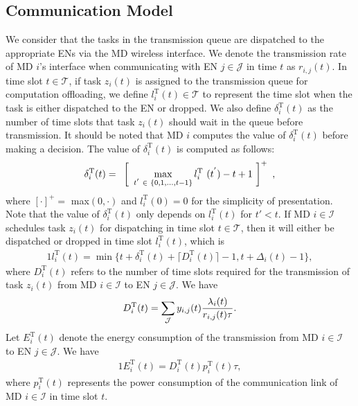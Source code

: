 \documentclass[12pt,draftclsnofoot,onecolumn]{IEEEtran}
\begin{document}
\subsection{Communication Model}
We consider that the tasks in the transmission queue are dispatched to the appropriate ENs via the MD wireless interface. We denote the transmission rate of MD $i$'s interface when communicating with EN $j \in \mathcal{J}$ in time $t$ as $r_{i,j}(t)$. In time slot $t \in \mathcal{T}$, if task $z_i(t)$ is assigned to the transmission queue for computation offloading, we define $l_i^{\text{T}}(t) \in \mathcal{T}$ to represent the time slot when the task is either dispatched to the EN or dropped. We also define $\delta_i^{\text{T}}(t)$ as the number of time slots that task $z_i(t)$ should wait in the queue before transmission. It should be noted that MD $i$ computes the value of $\delta_i^{\text{T}}(t)$ before making a decision. The value of $\delta_i^{\text{T}}(t)$ is computed as follows:
\begin{alignat}{1}
	\delta_i^{\text{T}}(t) =\textcolor{white}{i} \left[ \textcolor{white}{i}\max\limits_{t^{'}\textcolor{white}{i} \in \textcolor{white}{i} \{0,1,\ldots,t-1\}} l_i^{\text{T}}\textcolor{white}{i}(t^{'})-t+1\textcolor{white}{i}\right]^+\textcolor{white}{i},
	\label{1}  
\end{alignat}
where $[\cdot]^+ =$ max$(0, \cdot)$ and $l_i^{\text{T}}(0)=0$ for the simplicity of presentation. Note that the value of $\delta_i^{\text{T}}(t)$ only depends on $l_i^{\text{T}}(t)$ for $t' < t$. If MD $i \in \mathcal{I}$ schedules task $z_i(t)$ for dispatching in time slot $t \in \mathcal{T}$, then it will either be dispatched or dropped in time slot $l_i^{\text{T}}(t)$, which is
\begin{alignat}{1}
	l_i^{\text{T}}(t) = \min \Big\{t + \delta_i^{\text{T}}(t) + \lceil{D_i^{\text{T}}(t)}\rceil - 1, t + \Delta_i(t) - 1\Big\},
	\label{2}  
\end{alignat}
where $D_i^{\text{T}}(t)$ refers to the number of time slots required for the transmission of task $z_i(t)$ from MD $i \in \mathcal{I}$ to EN $j \in \mathcal{J}$. We have
\begin{alignat}{1}
	D_i^{\text{T}}(t) =  \sum_{\mathcal{J}} y_{i,j}(t) {\lambda_i(t) \over r_{i,j}(t)\tau}.
	\label{3}  
\end{alignat}
Let $E_i^{\text{T}}(t)$ denote the energy consumption of the transmission from MD $i \in \mathcal{I}$ to EN $j \in \mathcal{J}$. We have
\begin{alignat}{1}
	E_i^{\text{T}}(t) = D_i^{\text{T}}(t)p_i^{\text{T}}(t)\tau,
	\label{4}  
\end{alignat}
where $p_i^{\text{T}}(t)$ represents the power consumption of the communication link of MD $i \in \mathcal{I}$ in time slot $t$.
\end{document}
